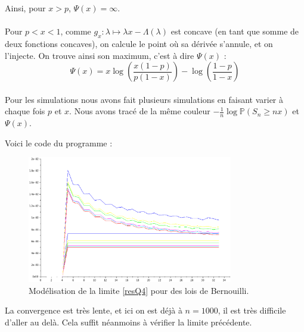 \documentclass[12pt]{article}
\renewcommand{\P}{\mathbb{P}}
\begin{document}
			Ainsi, pour $x > p$, $\Psi(x) = \infty$.
			
			\paragraph{} Pour $p < x < 1$, comme $g_x : \lambda \mapsto \lambda x - \Lambda( \lambda )$ est concave (en tant que somme de deux fonctions concaves), on calcule le point où sa dérivée s'annule, et on l'injecte. On trouve ainsi son maximum, c'est à dire $\Psi(x)$ :
			\begin{equation}
			\boxed{\Psi(x) = x \log\left(\frac{x (1-p)}{p (1-x)}\right)  - \log\left(\frac{1-p}{1-x}\right)} \label{resQ5}
			\end{equation}
			
			
			\paragraph{}Pour les simulations nous avons fait plusieurs simulations en faisant varier à chaque fois $p$ et $x$. Nous avons tracé de la même couleur $-\frac{1}{n} \log \P(S_n \geqslant nx)$ et $\Psi(x)$.
			
			Voici le code du programme :
			
			\begin{mdframed}[default]
				
			\end{mdframed}		
			
			
			\begin{figure}[H]
				\centering
				\caption{Modélisation de la limite \ref{resQ4} pour des lois de Bernouilli.}
				\includegraphics[width=0.8\textwidth]{../Scilab/Images/1_5.eps}
			\end{figure}
						
			La convergence est très lente, et ici on est déjà à $n = 1 000$, il est très difficile d'aller au delà. Cela suffit néanmoins à vérifier la limite précédente.
			
\end{document}
